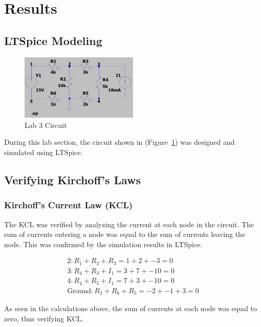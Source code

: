 \documentclass{article}
\begin{document}
\section{Results}


\subsection{LTSpice Modeling}

\begin{figure}[H]
	\centering
	\includegraphics[width=0.5\textwidth]{Lab 3 Circuit.PNG}
	\caption{Lab 3 Circuit}
	\label{fig:fig1}
\end{figure}

During this lab section, the circuit shown in (Figure~\ref{fig:fig1}) was designed and simulated using LTSpice.

\subsection{Verifying Kirchoff's Laws}
\subsubsection{Kirchoff's Current Law (KCL)}
The KCL was verified by analyzing the current at each node in the circuit. 
The sum of currents entering a node was equal to the sum of currents leaving the 
node. This was confirmed by the simulation results in LTSpice.

\begin{equation}
    \begin{split}
        2: R_{1} + R_{2} + R_{3} = 1 + 2  + -3 = 0 \\
        3: R_{4} + R_{3} + I_{1} = 3 + 7  + -10 = 0 \\
        4: R_{4} + R_{5} + I_{1} = 7 + 3  + -10 = 0 \\
        \text{Ground}: R_{2} + R_{6} + R_{5} = -2 + -1 + 3 = 0
    \end{split}
\end{equation}

As seen in the calculations above, the sum of currents at each node was equal to zero, thus verifying KCL.
\newline
\end{document}
